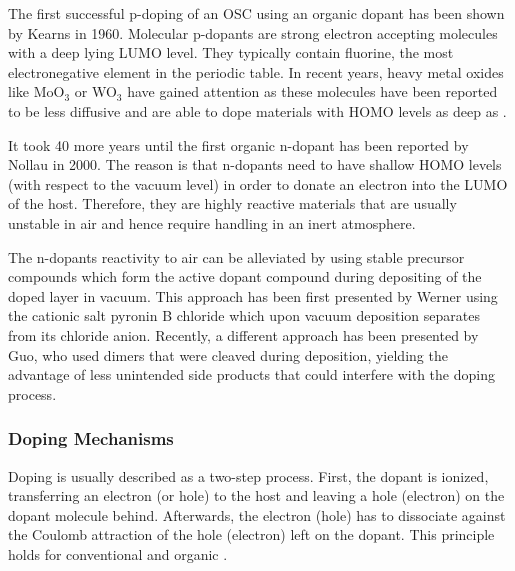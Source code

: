 The first successful p-doping of an OSC using an organic dopant has been shown by Kearns\etal\cite{Kearns1960} in 1960. Molecular p-dopants are strong electron accepting molecules with a deep lying LUMO level. They typically contain fluorine, the most electronegative element in the periodic table.
In recent years, heavy metal oxides like MoO$_3$ or WO$_3$ have gained attention as these molecules have been reported to be less diffusive\cite{Chang2006} and are able to dope materials with HOMO levels as deep as \cite{Meyer2009,Kroger2009}.

It took 40 more years until the first organic n-dopant has been reported by Nollau\etal\cite{Nollau2000} in 2000. The reason is that n-dopants need to have shallow HOMO levels (with respect to the vacuum level) in order to donate an electron into the LUMO of the host. Therefore, they are highly reactive materials that are usually unstable in air and hence require handling in an inert atmosphere.

The n-dopants reactivity to air can be alleviated by using stable precursor compounds which form the active dopant compound \insitu during depositing of the doped layer in vacuum. This approach has been first presented by Werner\etal\cite{Werner2003} using the cationic salt %
pyronin B chloride which upon vacuum deposition separates from its chloride anion. Recently, a different approach has been presented by Guo\etal\cite{Guo2012}, who used dimers that were cleaved during deposition, yielding the advantage of less unintended side products that could interfere with the doping process.

\subsubsection{Doping Mechanisms}\label{sec:Theo-org-Doping-Mechanisms}
Doping is usually described as a two-step process. First, the dopant is ionized, transferring an electron (or hole) to the host and leaving a hole (electron) on the dopant molecule behind. Afterwards, the electron (hole) has to dissociate against the Coulomb attraction of the hole (electron) left on the dopant. This principle holds for conventional and organic \SCs.


